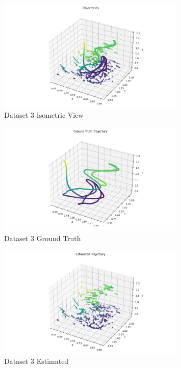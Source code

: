 \documentclass{article}
\begin{document}
\begin{figure}[H]
    \centering
    \includegraphics[width=0.8\textwidth]{./imgs/task1_2/studentdata3_isometric.png}
    \caption{Dataset 3 Isometric View}
\end{figure}

\begin{figure}[H]
    \centering
    \includegraphics[width=0.8\textwidth]{./imgs/task1_2/studentdata3_ground_truth.png}
    \caption{Dataset 3 Ground Truth}
\end{figure}

\begin{figure}[H]
    \centering
    \includegraphics[width=0.8\textwidth]{./imgs/task1_2/studentdata3_estimated.png}
    \caption{Dataset 3 Estimated}
\end{figure}
\end{document}
